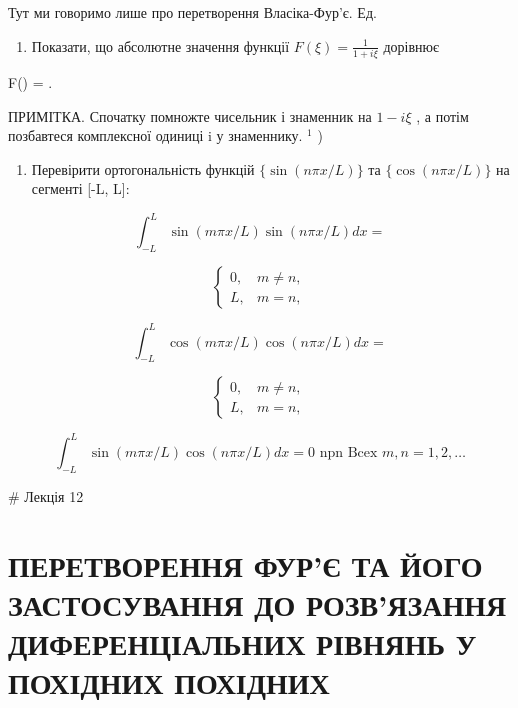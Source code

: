 \documentclass[
  ukrainian,
]{article}
\providecommand{\tightlist}{%
  \setlength{\itemsep}{0pt}\setlength{\parskip}{0pt}}
\begin{document}
Тут ми говоримо лише про перетворення Власіка-Фур'є. Ед.

\begin{enumerate}
\def\labelenumi{\arabic{enumi}.}
\setcounter{enumi}{4}
\tightlist
\item
  Показати, що абсолютне значення функції \(F(\xi) = \frac{1}{1+i\xi}\)
  дорівнює
\end{enumerate}

\textbar F(\xi)\textbar{} = .

ПРИМІТКА. Спочатку помножте чисельник і знаменник на \(1-i\xi\) , а
потім позбавтеся комплексної одиниці i у знаменнику. \(^1\) )

\begin{enumerate}
\def\labelenumi{\arabic{enumi}.}
\setcounter{enumi}{5}
\tightlist
\item
  Перевірити ортогональність функцій \(\{\sin(n\pi x/L)\}\) та
  \(\{\cos(n\pi x/L)\}\) на сегменті {[}-L, L{]}:
\end{enumerate}

\[
\int_{-L}^{L} \sin(m\pi x/L) \sin(n\pi x/L) dx =
\]

\[
\begin{cases} 0, & m \neq n, \\ L, &m = n, \end{cases}
\]

\[
\int_{-L}^{L} \cos(m\pi x/L) \cos(n\pi x/L) dx =
\]

\[
\begin{cases} 0, & m \neq n, \\ L, &m = n, \end{cases}
\]

\[
\int_{-L}^{L} \sin(m\pi x/L) \cos(n\pi x/L) dx = 0 \text{ npn Bcex } m, n = 1, 2, \dots
\]

\# Лекція 12

\section{ПЕРЕТВОРЕННЯ ФУР'Є ТА ЙОГО ЗАСТОСУВАННЯ ДО РОЗВ'ЯЗАННЯ
ДИФЕРЕНЦІАЛЬНИХ РІВНЯНЬ У ПОХІДНИХ
ПОХІДНИХ}\label{ux43fux435ux440ux435ux442ux432ux43eux440ux435ux43dux43dux44f-ux444ux443ux440ux454-ux442ux430-ux439ux43eux433ux43e-ux437ux430ux441ux442ux43eux441ux443ux432ux430ux43dux43dux44f-ux434ux43e-ux440ux43eux437ux432ux44fux437ux430ux43dux43dux44f-ux434ux438ux444ux435ux440ux435ux43dux446ux456ux430ux43bux44cux43dux438ux445-ux440ux456ux432ux43dux44fux43dux44c-ux443-ux43fux43eux445ux456ux434ux43dux438ux445-ux43fux43eux445ux456ux434ux43dux438ux445}
\end{document}
